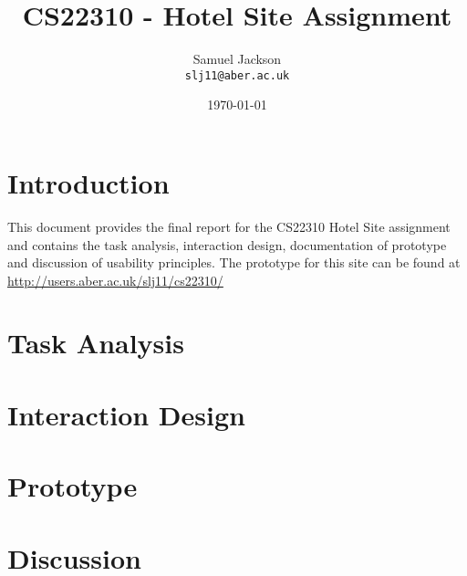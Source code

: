 \documentclass{article}
\begin{document}
\title{CS22310 - Hotel Site Assignment}
\author{Samuel Jackson \\ \texttt{slj11@aber.ac.uk}}
\date{\today}
\maketitle

\section{Introduction}
This document provides the final report for the CS22310 Hotel Site assignment and contains the task analysis, interaction design, documentation of prototype and discussion of usability principles. The prototype for this site can be found at \url{http://users.aber.ac.uk/slj11/cs22310/}

\section{Task Analysis}


\section{Interaction Design}

\section{Prototype}

\section{Discussion}
\end{document}
